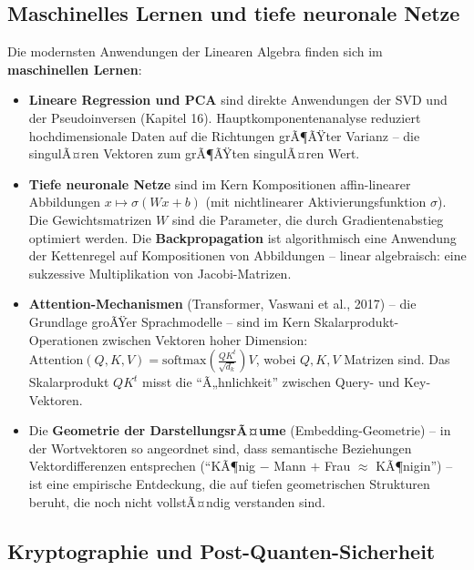 ﻿\documentclass[a4paper,12pt]{report}
\theoremstyle{definition}
\begin{document}
\subsection*{Maschinelles Lernen und tiefe neuronale Netze}

Die modernsten Anwendungen der Linearen Algebra finden sich im
\textbf{maschinellen Lernen}:
\begin{itemize}
    \item[-] \textbf{Lineare Regression und PCA} sind direkte
          Anwendungen der SVD und der Pseudoinversen (Kapitel 16).
          Hauptkomponentenanalyse reduziert hochdimensionale Daten
          auf die Richtungen grÃ¶ÃŸter Varianz -- die singulÃ¤ren
          Vektoren zum grÃ¶ÃŸten singulÃ¤ren Wert.
    \item[-] \textbf{Tiefe neuronale Netze} sind im Kern Kompositionen
          affin-linearer Abbildungen $x \mapsto \sigma(Wx + b)$
          (mit nichtlinearer Aktivierungsfunktion $\sigma$).
          Die Gewichtsmatrizen $W$ sind die Parameter, die durch
          Gradientenabstieg optimiert werden. Die
          \textbf{Backpropagation} ist algorithmisch eine Anwendung
          der Kettenregel auf Kompositionen von Abbildungen --
          linear algebraisch: eine sukzessive Multiplikation von
          Jacobi-Matrizen.
    \item[-] \textbf{Attention-Mechanismen} (Transformer, Vaswani et al.,
          2017) -- die Grundlage groÃŸer Sprachmodelle -- sind
          im Kern Skalarprodukt-Operationen zwischen Vektoren
          hoher Dimension: $\mathrm{Attention}(Q, K, V) =
          \mathrm{softmax}\!\left(\frac{QK^t}{\sqrt{d_k}}\right)V$,
          wobei $Q, K, V$ Matrizen sind. Das Skalarprodukt $QK^t$
          misst die ``Ã„hnlichkeit'' zwischen Query- und Key-Vektoren.
    \item[-] Die \textbf{Geometrie der Dar\-stellungs\-rÃ¤u\-me}
          (Embedding-Geometrie) -- in der Wortvektoren so
          angeordnet sind, dass semantische Beziehungen
          Vektordifferenzen entsprechen (``KÃ¶nig $-$ Mann $+$
          Frau $\approx$ KÃ¶nigin'') -- ist eine empirische
          Entdeckung, die auf tiefen geometrischen Strukturen
          beruht, die noch nicht vollstÃ¤ndig verstanden sind.
\end{itemize}

\subsection*{Kryptographie und Post-Quanten-Sicherheit}
\end{document}
